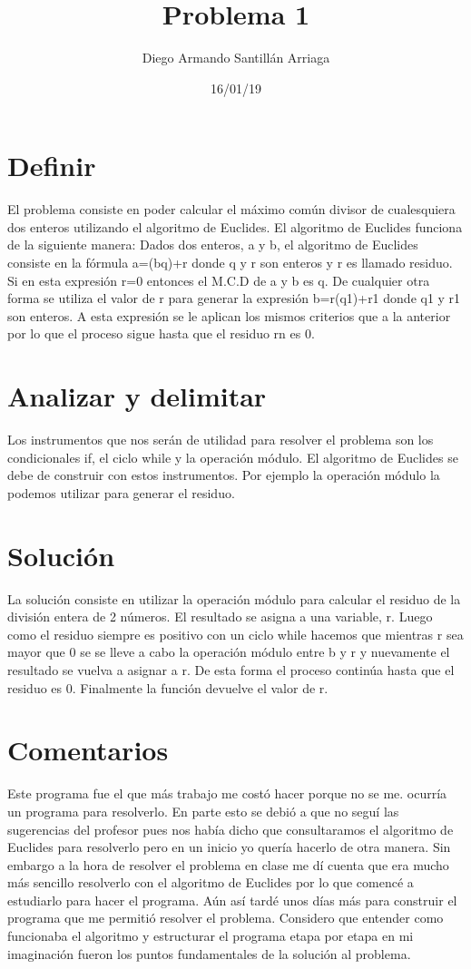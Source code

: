 \documentclass[letterpaper, 12pt, oneside]{article}%
\title{\Huge Problema 1}
\author{Diego Armando Santillán Arriaga}
\date{16/01/19}
\begin{document}
\maketitle
\newpage
\section*{Definir}
El problema consiste en poder calcular el máximo común divisor de cualesquiera dos enteros utilizando el algoritmo de Euclides. El algoritmo de Euclides funciona de la siguiente manera:
Dados dos enteros, a y b, el algoritmo de Euclides consiste en la
fórmula a=(bq)+r donde q y r son enteros y r es llamado residuo. Si en esta expresión
r=0 entonces el M.C.D de a y b es q. De cualquier otra forma se utiliza el valor
de r para generar la expresión b=r(q1)+r1 donde q1 y r1 son enteros. A esta expresión
se le aplican los mismos criterios que a la anterior por lo que el proceso sigue
hasta que el residuo rn es 0.
\section*{Analizar y delimitar}
Los instrumentos que nos serán de utilidad para resolver el problema son los condicionales if, el ciclo while y la operación módulo.
El algoritmo de Euclides se debe de construir con estos instrumentos. Por ejemplo la operación módulo la podemos utilizar para generar el residuo. 
\section*{Solución}
La solución consiste en utilizar la operación módulo para calcular el residuo de la división entera de 2 números. El resultado se asigna a una variable, r. Luego como el residuo siempre es positivo con un ciclo while hacemos que mientras r sea mayor que 0 se se lleve a cabo la operación módulo entre b y r y nuevamente el resultado se vuelva a asignar a r. De esta forma el proceso continúa hasta que el residuo es 0. Finalmente la función devuelve el valor de r. 

\section*{Comentarios}
Este programa fue el que más trabajo me costó hacer porque no se me. ocurría un programa para resolverlo. En parte esto se debió a que no seguí las sugerencias del profesor pues nos había dicho que consultaramos el algoritmo de Euclides para resolverlo pero en un inicio yo quería hacerlo de otra manera. Sin embargo a la hora de resolver el problema en clase me dí cuenta que era mucho más sencillo resolverlo con el algoritmo de Euclides por lo que comencé a estudiarlo para hacer el programa. Aún así tardé unos días más para construir el programa que me permitió resolver el problema. Considero que entender como funcionaba el algoritmo y estructurar el programa etapa por etapa en mi imaginación fueron los puntos fundamentales de la solución al problema. 
	
\end{document}

